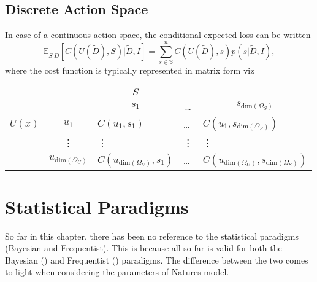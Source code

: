 \subsection{Discrete Action Space}
In case of a continuous action space, the conditional expected loss can be written
\begin{equation}
	\mathbb{E}_{S|\tilde{D}}[C(U(\tilde{D}), S)|\tilde{D},I] = \sum_{s\in \mathbb{S}}^nC(U(\tilde{D}),s)p(s|\tilde{D},I),
\end{equation}
where the cost function is typically represented in matrix form viz
\begin{center}
	\begin{tabular}{ c  c  c  c  c  }
		&& $S$& & \\
		&& $s_1$ & \dots & $s_{\text{dim}(\Omega_S)}$ \\
		\cline{3-5}
		$U(x)$ & $u_1$& \multicolumn{1}{|l}{$C(u_1, s_1)$} &\multicolumn{1}{l}{\dots}&\multicolumn{1}{l|}{$C(u_1, s_{\text{dim}(\Omega_S)})$} \\
		& \vdots & \multicolumn{1}{|l}{\vdots} &\multicolumn{1}{l}{\vdots}&\multicolumn{1}{l|}{\vdots} \\
		& $u_{\text{dim}(\Omega_U)}$ & \multicolumn{1}{|l}{$C(u_{\text{dim}(\Omega_U)}, s_1)$} &\multicolumn{1}{l}{\dots}&\multicolumn{1}{l|}{$C(u_{\text{dim}(\Omega_U)}, s_{\text{dim}(\Omega_S)})$} \\
		\cline{3-5}
	\end{tabular}
\end{center}

\section{Statistical Paradigms}
So far in this chapter, there has been no reference to the statistical paradigms (Bayesian and Frequentist). This is because all so far is valid for both the Bayesian () and Frequentist () paradigms. The difference between the two comes to light when considering the parameters of Natures model.  

